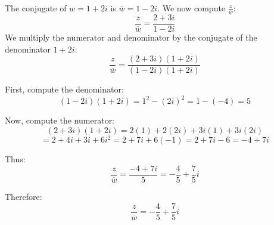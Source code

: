 \documentclass[11pt]{article}
\begin{document}
The conjugate of \( w = 1 + 2i \) is \( \overline{w} = 1 - 2i \). We now compute \( \frac{z}{\overline{w}} \):
\[
\frac{z}{\overline{w}} = \frac{2 + 3i}{1 - 2i}
\]
We multiply the numerator and denominator by the conjugate of the denominator \( 1 + 2i \):
\[
\frac{z}{\overline{w}} = \frac{(2 + 3i)(1 + 2i)}{(1 - 2i)(1 + 2i)}
\]

First, compute the denominator:
\[
(1 - 2i)(1 + 2i) = 1^2 - (2i)^2 = 1 - (-4) = 5
\]

Now, compute the numerator:
\[
(2 + 3i)(1 + 2i) = 2(1) + 2(2i) + 3i(1) + 3i(2i)
\]
\[
= 2 + 4i + 3i + 6i^2 = 2 + 7i + 6(-1) = 2 + 7i - 6 = -4 + 7i
\]

Thus:
\[
\frac{z}{\overline{w}} = \frac{-4 + 7i}{5} = -\frac{4}{5} + \frac{7}{5}i
\]

Therefore:
\[
\frac{z}{\overline{w}} = -\frac{4}{5} + \frac{7}{5}i
\]
\end{document}

